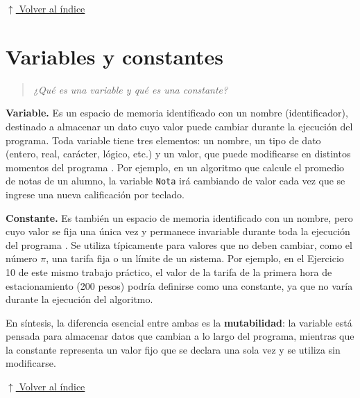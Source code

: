 \documentclass[12pt]{article}
\newcommand{\volverindice}{%
    \vspace{1em}%
    \begin{flushright}%
        \hyperlink{indice}{\small $\uparrow$ Volver al índice}%
    \end{flushright}%
}
\newcommand{\enunciado}[1]{%
    \begin{quote}
        \itshape #1
    \end{quote}
}
\begin{document}
\volverindice
\newpage


\section{Variables y constantes}

\enunciado{¿Qué es una variable y qué es una constante?}

\textbf{Variable.} Es un espacio de memoria identificado con un nombre (identificador), destinado a almacenar un dato cuyo valor puede cambiar durante la ejecución del programa. Toda variable tiene tres elementos: un nombre, un tipo de dato (entero, real, carácter, lógico, etc.) y un valor, que puede modificarse en distintos momentos del programa \parencite{joyanes2008fundamentos}. Por ejemplo, en un algoritmo que calcule el promedio de notas de un alumno, la variable \texttt{Nota} irá cambiando de valor cada vez que se ingrese una nueva calificación por teclado.

\textbf{Constante.} Es también un espacio de memoria identificado con un nombre, pero cuyo valor se fija una única vez y permanece invariable durante toda la ejecución del programa \parencite{cairo2005metodologia}. Se utiliza típicamente para valores que no deben cambiar, como el número $\pi$, una tarifa fija o un límite de un sistema. Por ejemplo, en el Ejercicio 10 de este mismo trabajo práctico, el valor de la tarifa de la primera hora de estacionamiento (200 pesos) podría definirse como una constante, ya que no varía durante la ejecución del algoritmo.

En síntesis, la diferencia esencial entre ambas es la \textbf{mutabilidad}: la variable está pensada para almacenar datos que cambian a lo largo del programa, mientras que la constante representa un valor fijo que se declara una sola vez y se utiliza sin modificarse.

\volverindice


\newpage
{}
{}
\printbibliography[title={Bibliografía}]
\end{document}
